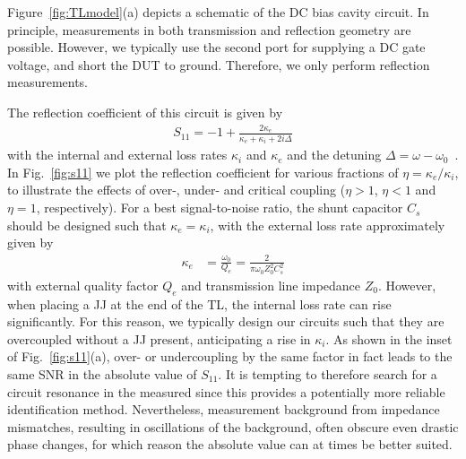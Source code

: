Figure~\ref{fig:TLmodel}(a) depicts a schematic of the DC bias cavity circuit.
%
In principle, measurements in both transmission and reflection geometry are possible.
%
However, we typically use the second port for supplying a DC gate voltage, and short the DUT to ground.
%
Therefore, we only perform reflection measurements.

The reflection coefficient of this circuit is given by
%
\begin{align}
S_{11}=-1+\frac{2\kappa_e}{\kappa_e+\kappa_i+2i\Delta}
\label{eq:intro-s11}
\end{align}
%
with the internal and external loss rates $\kappa_i$ and $\kappa_e$ and the detuning $\Delta=\omega-\omega_0$~\cite{bosmanBroadbandArchitectureGalvanically2015c}.
%
In Fig.~\ref{fig:s11} we plot the reflection coefficient for various fractions of $\eta =\kappa_e/\kappa_i$, to illustrate the effects of over-, under- and critical coupling ($\eta >1$, $\eta <1$ and $\eta =1$, respectively).
%
For a best signal-to-noise ratio, the shunt capacitor $C_s$ should be designed such that $\kappa_e=\kappa_i$, with the external loss rate approximately given by
%
\begin{align}
\kappa_e &= \frac{\omega_0}{Q_e} = \frac{2}{\pi\omega_0Z_0^2C_s^2}
\label{eq:intro-kappae}
\end{align}
%
with external quality factor $Q_e$ and transmission line impedance $Z_0$.
%
However, when placing a JJ at the end of the TL, the internal loss rate can rise significantly.
%
For this reason, we typically design our circuits such that they are overcoupled without a JJ present, anticipating a rise in $\kappa_i$.
%
As shown in the inset of Fig.~\ref{fig:s11}(a), over- or undercoupling by the same factor in fact leads to the same SNR in the absolute value of $S_{11}$.
%
It is tempting to therefore search for a circuit resonance in the measured since this provides a potentially more reliable identification method.
%
Nevertheless, measurement background from impedance mismatches, resulting in oscillations of the background, often obscure even drastic phase changes, for which reason the absolute value can at times be better suited.

